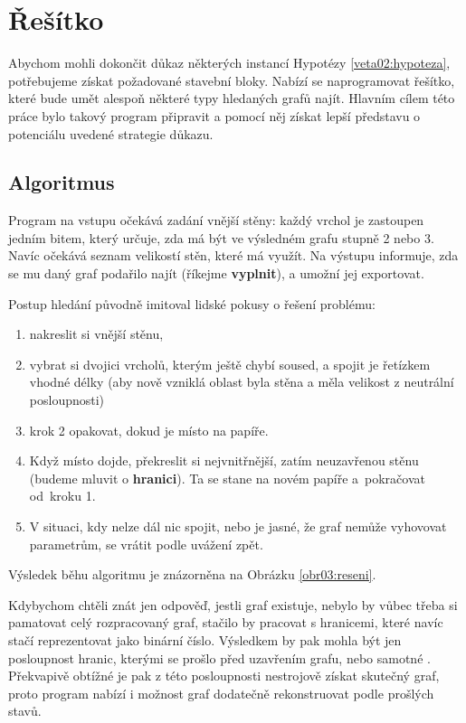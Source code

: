 
\chapter{Řešítko} \label{resitko}
Abychom mohli dokončit důkaz některých instancí Hypotézy \ref{veta02:hypoteza}, potřebujeme získat požadované stavební bloky. Nabízí se naprogramovat řešítko, které bude umět alespoň některé typy hledaných grafů najít. Hlavním cílem této práce bylo takový program připravit a pomocí něj získat lepší představu o potenciálu uvedené strategie důkazu.

\section{Algoritmus}

Program na vstupu očekává zadání vnější stěny: každý vrchol je zastoupen jedním bitem, který určuje, zda má být ve výsledném grafu stupně 2 nebo 3. Navíc očekává seznam velikostí stěn, které má využít. Na výstupu informuje, zda se mu daný graf podařilo najít (říkejme \textbf{vyplnit}), a umožní jej exportovat.

Postup hledání původně imitoval lidské pokusy o řešení problému: 

\begin{enumerate}
\item nakreslit si vnější stěnu,
\item vybrat si dvojici vrcholů, kterým ještě chybí soused, a spojit je řetízkem vhodné délky (aby nově vzniklá oblast byla stěna a měla velikost z neutrální posloupnosti)
\item krok 2 opakovat, dokud je místo na papíře.
\item Když místo dojde, překreslit si nejvnitřnější, zatím neuzavřenou stěnu (budeme mluvit o \textbf{hranici}). Ta se stane  na novém papíře a~pokračovat od~kroku 1.
\item V situaci, kdy nelze dál nic spojit, nebo je jasné, že graf nemůže vyhovovat parametrům, se vrátit podle uvážení zpět.
\end{enumerate}

Výsledek běhu algoritmu je znázorněna na Obrázku \ref{obr03:reseni}.

Kdybychom chtěli znát jen  odpověď, jestli graf existuje, nebylo by vůbec třeba si pamatovat celý rozpracovaný graf, stačilo by pracovat s hranicemi, které navíc stačí reprezentovat jako binární číslo. Výsledkem by pak mohla být jen posloupnost hranic, kterými se prošlo před uzavřením grafu, nebo samotné . Překvapivě obtížné je pak z této posloupnosti nestrojově získat skutečný graf, proto program nabízí i možnost graf dodatečně rekonstruovat podle prošlých stavů.

